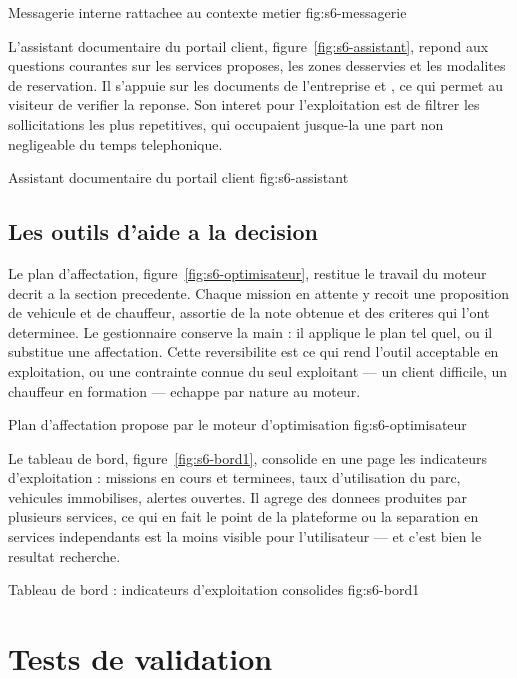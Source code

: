   {Messagerie interne rattachee au contexte metier}
  {fig:s6-messagerie}

L'assistant documentaire du portail client, figure~\ref{fig:s6-assistant},
repond aux questions courantes sur les services proposes, les zones
desservies et les modalites de reservation. Il s'appuie sur les documents
de l'entreprise et , ce qui permet au visiteur
de verifier la reponse. Son interet pour l'exploitation est de filtrer les
sollicitations les plus repetitives, qui occupaient jusque-la une part
non negligeable du temps telephonique.

  {Assistant documentaire du portail client}
  {fig:s6-assistant}

\subsection{Les outils d'aide a la decision}

Le plan d'affectation, figure~\ref{fig:s6-optimisateur}, restitue le
travail du moteur decrit a la section precedente. Chaque mission en
attente y recoit une proposition de vehicule et de chauffeur, assortie
de la note obtenue et des criteres qui l'ont determinee. Le gestionnaire
conserve la main : il applique le plan tel quel, ou il substitue une
affectation. Cette reversibilite est ce qui rend l'outil acceptable en
exploitation, ou une contrainte connue du seul exploitant --- un client
difficile, un chauffeur en formation --- echappe par nature au moteur.

  {Plan d'affectation propose par le moteur d'optimisation}
  {fig:s6-optimisateur}

Le tableau de bord, figure~\ref{fig:s6-bord1}, consolide en une page les
indicateurs d'exploitation : missions en cours et terminees, taux
d'utilisation du parc, vehicules immobilises, alertes ouvertes. Il agrege
des donnees produites par plusieurs services, ce qui en fait le point de
la plateforme ou la separation en services independants est la moins
visible pour l'utilisateur --- et c'est bien le resultat recherche.

  {Tableau de bord : indicateurs d'exploitation consolides}
  {fig:s6-bord1}

\section{Tests de validation}

